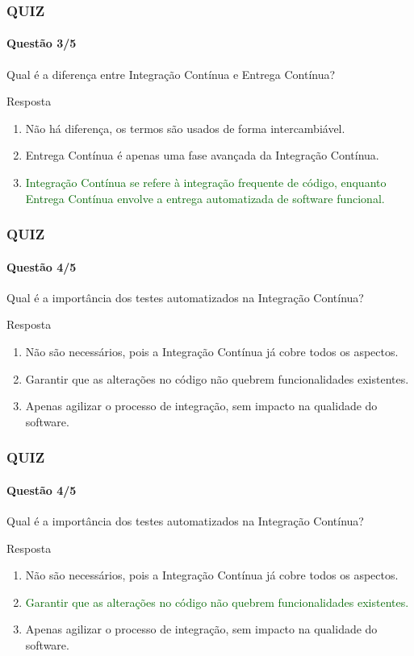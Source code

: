 \documentclass[
	9pt, %
	t, %
]{beamer}
\begin{document}
\begin{frame}
	\frametitle{QUIZ}
	\framesubtitle{Questão 3/5}

	{\Large Qual é a diferença entre Integração Contínua e Entrega Contínua? }

	\begin{exampleblock}{Resposta}
		\begin{enumerate}[a]
			\item Não há diferença, os termos são usados de forma intercambiável.
			\item Entrega Contínua é apenas uma fase avançada da Integração Contínua.
			\item \textcolor{darkgreen}{Integração Contínua se refere à integração frequente de código, enquanto Entrega Contínua envolve a entrega automatizada de software funcional.}
		\end{enumerate}
	\end{exampleblock}

\end{frame}

\begin{frame}
	\frametitle{QUIZ}
	\framesubtitle{Questão 4/5}

	{\Large Qual é a importância dos testes automatizados na Integração Contínua? }

	\begin{exampleblock}{Resposta}
		\begin{enumerate}[a]
			\item Não são necessários, pois a Integração Contínua já cobre todos os aspectos.
			\item Garantir que as alterações no código não quebrem funcionalidades existentes.
			\item Apenas agilizar o processo de integração, sem impacto na qualidade do software.
		\end{enumerate}
	\end{exampleblock}

\end{frame}

\begin{frame}
	\frametitle{QUIZ}
	\framesubtitle{Questão 4/5}

	{\Large Qual é a importância dos testes automatizados na Integração Contínua? }

	\begin{exampleblock}{Resposta}
		\begin{enumerate}[a]
			\item Não são necessários, pois a Integração Contínua já cobre todos os aspectos.
			\item \textcolor{darkgreen}{Garantir que as alterações no código não quebrem funcionalidades existentes.}
			\item Apenas agilizar o processo de integração, sem impacto na qualidade do software.
		\end{enumerate}
	\end{exampleblock}

\end{frame}
\end{document}
